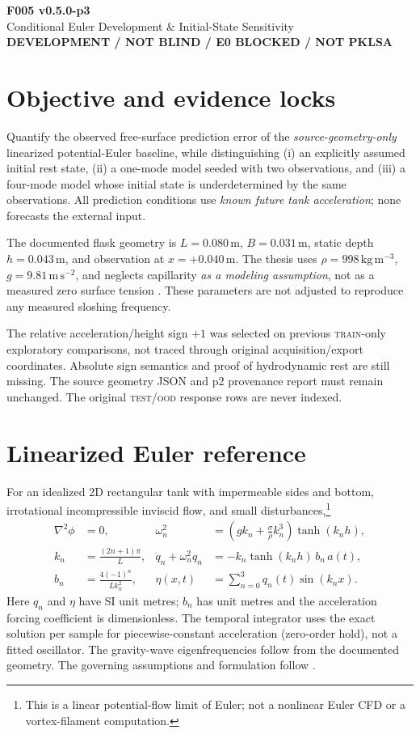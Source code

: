 \documentclass[10pt,a4paper]{article}
\begin{document}
\begin{center}
{\LARGE\bfseries F005 v0.5.0-p3}\\[4pt]
{\large Conditional Euler Development \& Initial-State Sensitivity}\\[5pt]
\textcolor{red!70!black}{\bfseries DEVELOPMENT / NOT BLIND / E0 BLOCKED / NOT PKLSA}
\end{center}
\section*{Objective and evidence locks}
Quantify the observed free-surface prediction error of the \emph{source-geometry-only} linearized potential-Euler baseline, while distinguishing (i) an explicitly assumed initial rest state, (ii) a one-mode model seeded with two observations, and (iii) a four-mode model whose initial state is underdetermined by the same observations. All prediction conditions use \emph{known future tank acceleration}; none forecasts the external input.

The documented flask geometry is $L=0.080\,\mathrm{m}$, $B=0.031\,\mathrm{m}$, static depth $h=0.043\,\mathrm{m}$, and observation at $x=+0.040\,\mathrm{m}$. The thesis uses $\rho=998\,\mathrm{kg\,m^{-3}}$, $g=9.81\,\mathrm{m\,s^{-2}}$, and neglects capillarity \emph{as a modeling assumption}, not as a measured zero surface tension \cite{Camilotto2026}. These parameters are not adjusted to reproduce any measured sloshing frequency.

The relative acceleration/height sign $+1$ was selected on previous \textsc{train}-only exploratory comparisons, not traced through original acquisition/export coordinates. Absolute sign semantics and proof of hydrodynamic rest are still missing. The source geometry JSON and p2 provenance report must remain unchanged. The original \textsc{test}/\textsc{ood} response rows are never indexed.

\section*{Linearized Euler reference}
For an idealized 2D rectangular tank with impermeable sides and bottom, irrotational incompressible inviscid flow, and small disturbances,\footnote{This is a linear potential-flow limit of Euler; not a nonlinear Euler CFD or a vortex-filament computation.}
\begin{align}
\nabla^2\phi&=0,&\omega_n^2&=\left(gk_n+\frac{\sigma}{\rho}k_n^3\right)\tanh(k_nh),\\
k_n&=\frac{(2n+1)\pi}{L},&
\ddot q_n+\omega_n^2q_n&=-k_n\tanh(k_nh)\,b_n\,a(t),\\
b_n&=\frac{4(-1)^n}{Lk_n^2},&\eta(x,t)&=\sum_{n=0}^{3}q_n(t)\sin(k_nx).
\end{align}
Here $q_n$ and $\eta$ have SI unit metres; $b_n$ has unit metres and the acceleration forcing coefficient is dimensionless. The temporal integrator uses the exact solution per sample for piecewise-constant acceleration (zero-order hold), not a fitted oscillator. The gravity-wave eigenfrequencies follow from the documented geometry. The governing assumptions and formulation follow \cite{FaltinsenTimokha2009,Camilotto2026}.
\end{document}
